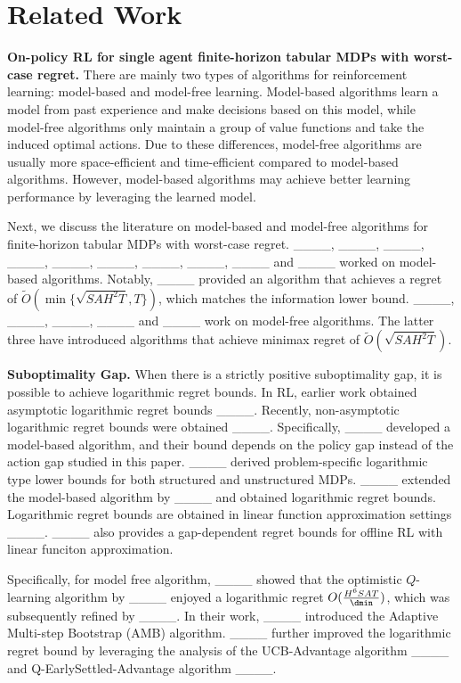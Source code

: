 \section{Related Work}
\label{related}
\textbf{On-policy RL for single agent finite-horizon tabular MDPs with worst-case regret.} There are mainly two types of algorithms for reinforcement learning: model-based and model-free learning. Model-based algorithms learn a model from past experience and make decisions based on this model, while model-free algorithms only maintain a group of value functions and take the induced optimal actions. Due to these differences, model-free algorithms are usually more space-efficient and time-efficient compared to model-based algorithms. However, model-based algorithms may achieve better learning performance by leveraging the learned model.

Next, we discuss the literature on model-based and model-free algorithms for finite-horizon tabular MDPs with worst-case regret. ____, ____, ____, ____, ____, ____, ____, ____, ____ and ____ worked on model-based algorithms. Notably, ____ provided an algorithm that achieves a regret of $\tilde{O}(\min \{\sqrt{SAH^2T},T\})$, which matches the information lower bound. ____, ____, ____, ____ and ____ work on model-free algorithms. The latter three have introduced algorithms that achieve minimax regret of $\tilde{O}(\sqrt{SAH^2T})$.

\textbf{Suboptimality Gap.} When there is a strictly positive suboptimality gap, it is possible to achieve logarithmic regret
bounds. In RL, earlier work obtained asymptotic logarithmic regret bounds ____.
Recently, non-asymptotic logarithmic regret bounds were obtained ____. Specifically, ____ developed a model-based algorithm, and their bound depends on the policy gap instead of the action gap studied in this paper. ____ derived problem-specific logarithmic type lower bounds for both structured and unstructured MDPs. ____ extended the model-based algorithm by ____ and obtained logarithmic regret bounds. Logarithmic regret bounds are obtained in linear function approximation settings ____. ____ also provides a gap-dependent regret bounds for offline RL with linear funciton approximation. 

Specifically, for model free algorithm, ____ showed that the optimistic $Q$-learning algorithm by ____ enjoyed a logarithmic regret $O(\frac{H^6SAT}{\dmin})$, which was subsequently refined by ____. In their work, ____ introduced the Adaptive Multi-step Bootstrap (AMB) algorithm. ____ further improved the logarithmic regret bound by leveraging the analysis of the UCB-Advantage algorithm ____ and Q-EarlySettled-Advantage algorithm ____.

